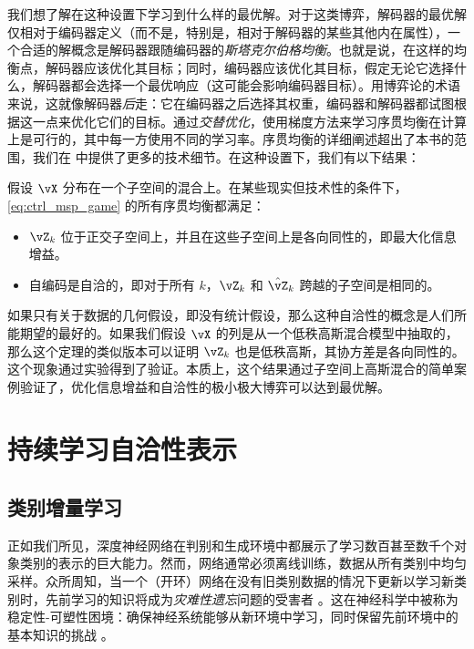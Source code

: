 \documentclass[../../book-main.tex]{subfiles}
\begin{document}
我们想了解在这种设置下学习到什么样的最优解。对于这类博弈，解码器的最优解仅相对于编码器定义（而不是，特别是，相对于解码器的某些其他内在属性），一个合适的解概念是解码器跟随编码器的\textit{斯塔克尔伯格均衡}。也就是说，在这样的均衡点，解码器应该优化其目标；同时，编码器应该优化其目标，假定无论它选择什么，解码器都会选择一个最优响应（这可能会影响编码器目标）。用博弈论的术语来说，这就像解码器\textit{后}走：它在编码器之后选择其权重，编码器和解码器都试图根据这一点来优化它们的目标。通过\textit{交替优化}，使用梯度方法来学习序贯均衡在计算上是可行的，其中每一方使用不同的学习率。序贯均衡的详细阐述超出了本书的范围，我们在  中提供了更多的技术细节。在这种设置下，我们有以下结果：
\begin{theorem}\label{thm:ctrl_theory}
    假设 \(\vX\) 分布在一个子空间的混合上。在某些现实但技术性的条件下，\eqref{eq:ctrl_msp_game} 的所有序贯均衡都满足：
    \begin{itemize}
        \item \(\vZ_{k}\) 位于正交子空间上，并且在这些子空间上是各向同性的，即最大化信息增益。
        \item 自编码是自洽的，即对于所有 \(k\)，\(\vZ_{k}\) 和 \(\hat{\vZ}_{k}\) 跨越的子空间是相同的。
    \end{itemize}
\end{theorem}
如果只有关于数据的几何假设，即没有统计假设，那么这种自洽性的概念是人们所能期望的最好的。如果我们假设 \(\vX\) 的列是从一个低秩高斯混合模型中抽取的，那么这个定理的类似版本可以证明 \(\vZ_{k}\) 也是低秩高斯，其协方差是各向同性的。这个现象通过实验得到了验证。本质上，这个结果通过子空间上高斯混合的简单案例验证了，优化信息增益和自洽性的极小极大博弈可以达到最优解。






\section{持续学习自洽性表示}
\label{sec:continuous}

\subsection{类别增量学习}
\label{sec:class-wise-incremental}

正如我们所见，深度神经网络在判别和生成环境中都展示了学习数百甚至数千个对象类别的表示的巨大能力。然而，网络通常必须离线训练，数据从所有类别中均匀采样。众所周知，当一个（开环）网络在没有旧类别数据的情况下更新以学习新类别时，先前学习的知识将成为{\em 灾难性遗忘}问题的受害者 \cite{McCloskey1989catastrophic}。这在神经科学中被称为稳定性-可塑性困境：确保神经系统能够从新环境中学习，同时保留先前环境中的基本知识的挑战 \cite{Grossberg1987CompetitiveLF}。
\end{document}
